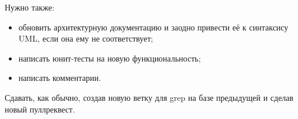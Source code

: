 \documentclass[a5paper]{homework}
\begin{document}
Нужно также:

\begin{itemize}
    \item обновить архитектурную документацию и заодно привести её к синтаксису UML, если она ему не соответствует;
    \item написать юнит-тесты на новую функциональность;
    \item написать комментарии.
\end{itemize}

Сдавать, как обычно, создав новую ветку для grep на базе предыдущей и сделав новый пуллреквест.
\end{document}
